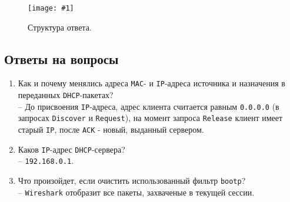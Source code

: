 \documentclass[12pt, a4paper]{article}
\newcommand{\figc}[4]{
  \begin{figure}[H]
  \begin{center}
    \texttt{[image: \#1]}
    \caption{#2}
    \label{fig:#3}
  \end{center}
  \end{figure}
}
\begin{document}
\figc{dhcp_res}{Структура ответа.}{dh_rs}{2.5}

\subsection{Ответы на вопросы}

\begin{enumerate}
  \item Как и почему менялись адреса \texttt{MAC}- и \texttt{IP}-адреса
    источника и назначения в переданных \texttt{DHCP}-пакетах?\\
    -- До присвоения \texttt{IP}-адреса, адрес клиента считается равным
    \texttt{0.0.0.0} (в запросах \texttt{Discover} и \texttt{Request}),
    на момент запроса \texttt{Release} клиент имеет старый \texttt{IP}, после
    \texttt{ACK} - новый, выданный сервером.
  \item Каков \texttt{IP}-адрес \texttt{DHCP}-сервера?\\
    -- \texttt{192.168.0.1}.
  \item Что произойдет, если очистить использованный фильтр \texttt{bootp}?\\
    -- \texttt{Wireshark} отобразит все пакеты, захваченые в текущей сессии.
\end{enumerate}
\end{document}
